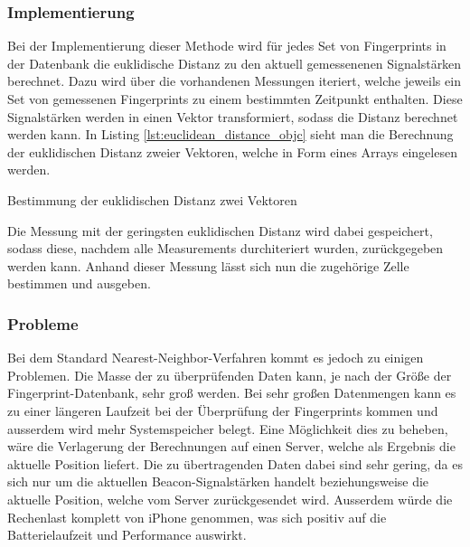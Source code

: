 \subsubsection{Implementierung}
\label{sec:implementation:fingerprinting:positioning:naiv:implementation}
Bei der Implementierung dieser Methode wird für jedes Set von Fingerprints in der Datenbank die euklidische Distanz zu den aktuell gemessenenen Signalstärken berechnet. Dazu wird über die vorhandenen Messungen iteriert, welche jeweils ein Set von gemessenen Fingerprints zu einem bestimmten Zeitpunkt enthalten. Diese Signalstärken werden in einen Vektor transformiert, sodass die Distanz berechnet werden kann. In Listing \ref{lst:euclidean_distance_objc} sieht man die Berechnung der euklidischen Distanz zweier Vektoren, welche in Form eines Arrays eingelesen werden.

\begin{listing}[htb!]
    \caption{Bestimmung der euklidischen Distanz zwei Vektoren}
	\label{lst:euclidean_distance_objc}
\end{listing}

Die Messung mit der geringsten euklidischen Distanz wird dabei gespeichert, sodass diese, nachdem alle Measurements durchiteriert wurden, zurückgegeben werden kann. Anhand dieser Messung lässt sich nun die zugehörige Zelle bestimmen und ausgeben.

\subsubsection{Probleme}
\label{sec:implementation:fingerprinting:positioning:naiv:problems}
Bei dem Standard Nearest-Neighbor-Verfahren kommt es jedoch zu einigen Problemen. 
Die Masse der zu überprüfenden Daten kann, je nach der Größe der Fingerprint-Datenbank, sehr groß werden. Bei sehr großen Datenmengen kann es zu einer längeren Laufzeit bei der Überprüfung der Fingerprints kommen und ausserdem wird mehr Systemspeicher belegt. 
Eine Möglichkeit dies zu beheben, wäre die Verlagerung der Berechnungen auf einen Server, welche als Ergebnis die aktuelle Position liefert. Die zu übertragenden Daten dabei sind sehr gering, da es sich nur um die aktuellen Beacon-Signalstärken handelt beziehungsweise die aktuelle Position, welche vom Server zurückgesendet wird. 
Ausserdem würde die Rechenlast komplett von iPhone genommen, was sich positiv auf die Batterielaufzeit und Performance auswirkt.

